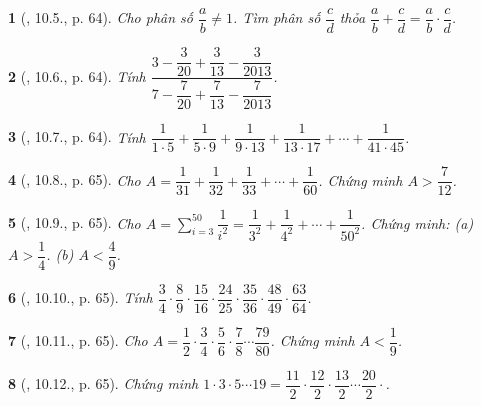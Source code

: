 \documentclass{article}
\newtheorem{baitoan}{}
\begin{document}
\begin{baitoan}[\cite{TLCT_THCS_Toan_6_so_hoc}, 10.5., p. 64]
	Cho phân số $\dfrac{a}{b}\ne1$. Tìm phân số $\dfrac{c}{d}$ thỏa $\dfrac{a}{b} + \dfrac{c}{d} = \dfrac{a}{b}\cdot\dfrac{c}{d}$.
\end{baitoan}

\begin{baitoan}[\cite{TLCT_THCS_Toan_6_so_hoc}, 10.6., p. 64]
	Tính $\dfrac{3 - \dfrac{3}{20} + \dfrac{3}{13} - \dfrac{3}{2013}}{7 - \dfrac{7}{20} + \dfrac{7}{13} - \dfrac{7}{2013}}$.
\end{baitoan}

\begin{baitoan}[\cite{TLCT_THCS_Toan_6_so_hoc}, 10.7., p. 64]
	Tính $\dfrac{1}{1\cdot5} + \dfrac{1}{5\cdot9} + \dfrac{1}{9\cdot13} + \dfrac{1}{13\cdot17} + \cdots + \dfrac{1}{41\cdot45}$.
\end{baitoan}

\begin{baitoan}[\cite{TLCT_THCS_Toan_6_so_hoc}, 10.8., p. 65]
	Cho $A = \dfrac{1}{31} + \dfrac{1}{32} + \dfrac{1}{33} + \cdots + \dfrac{1}{60}$. Chứng minh $A > \dfrac{7}{12}$.
\end{baitoan}

\begin{baitoan}[\cite{TLCT_THCS_Toan_6_so_hoc}, 10.9., p. 65]
	Cho $A = \sum_{i=3}^{50} \dfrac{1}{i^2} = \dfrac{1}{3^2} + \dfrac{1}{4^2} + \cdots + \dfrac{1}{50^2}$. Chứng minh: (a) $A > \dfrac{1}{4}$. (b) $A < \dfrac{4}{9}$.
\end{baitoan}

\begin{baitoan}[\cite{TLCT_THCS_Toan_6_so_hoc}, 10.10., p. 65]
	Tính $\dfrac{3}{4}\cdot\dfrac{8}{9}\cdot\dfrac{15}{16}\cdot\dfrac{24}{25}\cdot\dfrac{35}{36}\cdot\dfrac{48}{49}\cdot\dfrac{63}{64}$.
\end{baitoan}

\begin{baitoan}[\cite{TLCT_THCS_Toan_6_so_hoc}, 10.11., p. 65]
	Cho $A = \dfrac{1}{2}\cdot\dfrac{3}{4}\cdot\dfrac{5}{6}\cdot\dfrac{7}{8}\cdots\dfrac{79}{80}$. Chứng minh $A < \dfrac{1}{9}$.
\end{baitoan}

\begin{baitoan}[\cite{TLCT_THCS_Toan_6_so_hoc}, 10.12., p. 65]
	Chứng minh $1\cdot3\cdot5\cdots19 = \dfrac{11}{2}\cdot\dfrac{12}{2}\cdot\dfrac{13}{2}\cdots\dfrac{20}{2}\cdot$.
\end{baitoan}
\end{document}
